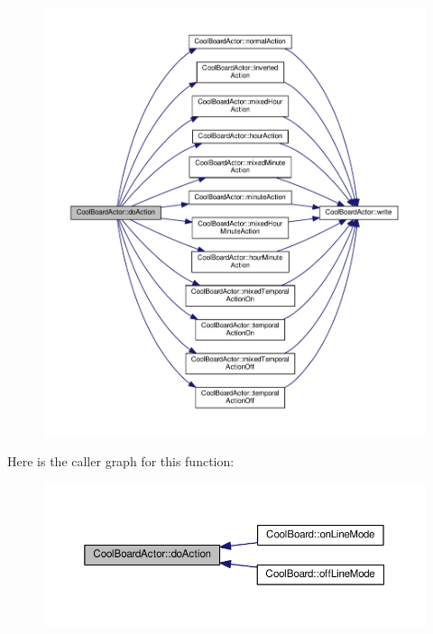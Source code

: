 \begin{figure}[H]
\begin{center}
\leavevmode
\includegraphics[width=350pt]{dc/d69/class_cool_board_actor_a96a45658d32c6b95caa2f385c7da32cd_cgraph}
\end{center}
\end{figure}
Here is the caller graph for this function\+:\nopagebreak
\begin{figure}[H]
\begin{center}
\leavevmode
\includegraphics[width=350pt]{dc/d69/class_cool_board_actor_a96a45658d32c6b95caa2f385c7da32cd_icgraph}
\end{center}
\end{figure}
\mbox{\label{class_cool_board_actor_adf3b4e15b9d73681082112adf8ef95cb}} 
